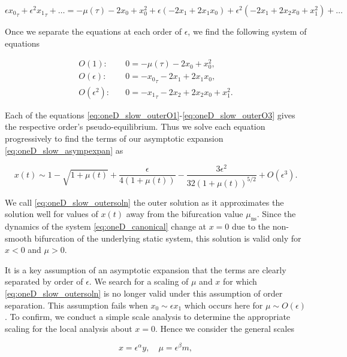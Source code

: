\begin{equation*}
\epsilon {x_0}_\tau +\epsilon^2 {x_1}_\tau+\ldots= -\mu(\tau) -2x_0+x_0^2+\epsilon(-2x_1+2x_1x_0)+\epsilon^2(-2x_1+2x_2x_0+x_1^2)+\ldots
\end{equation*}

Once we separate the equations at each order of $\epsilon$, we find the following system of equations

\begin{align}
\label{eq:oneD_slow_outerO1}
O(1):& \quad 0=-\mu(\tau)-2x_0+x_0^2,\\
\label{eq:oneD_slow_outerO2}
O(\epsilon):& \quad 0=-{x_0}_\tau-2x_1+2x_1 x_0,\\
\label{eq:oneD_slow_outerO3}
O(\epsilon^2):& \quad 0=-{x_1}_\tau-2x_2+2x_2x_0+x_1^2.
\end{align}

Each of the equations \eqref{eq:oneD_slow_outerO1}-\eqref{eq:oneD_slow_outerO3} gives the respective order's pseudo-equilibrium. Thus we solve each equation progressively to find the terms of our asymptotic expansion \eqref{eq:oneD_slow_asympexpan} as

\begin{equation}\label{eq:oneD_slow_outersoln}
x(t)\sim 1-\sqrt{1+\mu(t)}+ \frac{\epsilon}{4(1+\mu(t))}-\frac{3\epsilon^2}{32(1+\mu(t))^{5/2}}+O(\epsilon^3).
\end{equation}

We call \eqref{eq:oneD_slow_outersoln} the outer solution as it approximates the solution well for values of $x(t)$ away from the bifurcation value $\mu_{\text{ns}}$. Since the dynamics of the system \eqref{eq:oneD_canonical} change at $x=0$ due to the non-smooth bifurcation of the underlying static system, this solution is valid only for $x<0$ and $\mu>0$.


\indent It is a key assumption of an asymptotic expansion that the terms are clearly separated by order of $\epsilon$. We search for a scaling of $\mu$ and $x$ for which \eqref{eq:oneD_slow_outersoln} is no longer valid under this assumption of order separation. This assumption fails when $x_0\sim \epsilon x_1$ which occurs here for $\mu\sim O(\epsilon)$. To confirm, we conduct a simple scale analysis to determine the appropriate scaling for the local analysis about $x=0$. Hence we consider the general scales

\begin{equation*}
x=\epsilon^\alpha y,\quad \mu = \epsilon^\beta m,
\end{equation*}

